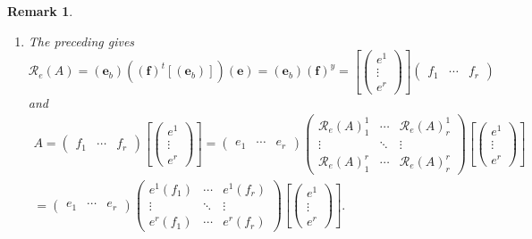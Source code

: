 \documentclass[aps,preprint]{revtex4}
\newtheorem{remark}[theorem]{Remark}
\begin{document}
\begin{remark}
\begin{enumerate}
\item The preceding gives 
\begin{equation}
\mathcal{R}_{e}\left( A\right) =\left( \boldsymbol{e}_{b}\right) \left( 
\overset{}{\left( \boldsymbol{f}\right) ^{t}\left[ \left( \boldsymbol{e}%
_{b}\right) \right] }\right) \left( \boldsymbol{e}\right) =\left( 
\boldsymbol{e}_{b}\right) \left( \boldsymbol{f}\right) ^{y}=\left[ \left( 
\begin{array}{c}
e^{1} \\ 
\vdots \\ 
e^{r}%
\end{array}%
\right) \right] \left( 
\begin{array}{ccc}
f_{1} & \cdots & f_{r}%
\end{array}%
\right)
\end{equation}%
and 
\begin{gather}
A=\left( 
\begin{array}{ccc}
f_{1} & \cdots & f_{r}%
\end{array}%
\right) \left[ \left( 
\begin{array}{c}
e^{1} \\ 
\vdots \\ 
e^{r}%
\end{array}%
\right) \right] =\left( 
\begin{array}{ccc}
e_{1} & \cdots & e_{r}%
\end{array}%
\right) \left( 
\begin{array}{ccc}
\mathcal{R}_{e}\left( A\right) _{1}^{1} & \cdots & \mathcal{R}_{e}\left(
A\right) _{r}^{1} \\ 
\vdots & \ddots & \vdots \\ 
\mathcal{R}_{e}\left( A\right) _{1}^{r} & \cdots & \mathcal{R}_{e}\left(
A\right) _{r}^{r}%
\end{array}%
\right) \left[ \left( 
\begin{array}{c}
e^{1} \\ 
\vdots \\ 
e^{r}%
\end{array}%
\right) \right] \\
=\left( 
\begin{array}{ccc}
e_{1} & \cdots & e_{r}%
\end{array}%
\right) \left( 
\begin{array}{ccc}
e^{1}\left( f_{1}\right) & \cdots & e^{1}\left( f_{r}\right) \\ 
\vdots & \ddots & \vdots \\ 
e^{r}\left( f_{1}\right) & \cdots & e^{r}\left( f_{r}\right)%
\end{array}%
\right) \left[ \left( 
\begin{array}{c}
e^{1} \\ 
\vdots \\ 
e^{r}%
\end{array}%
\right) \right] .
\end{gather}
\end{enumerate}
\end{remark}
\end{document}
